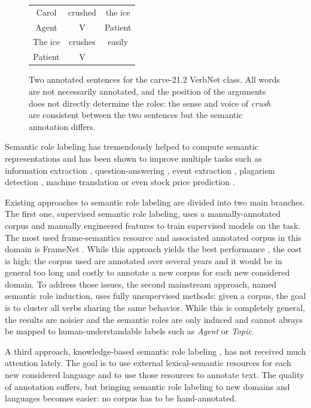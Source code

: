 \begin{figure}[ht]
    \centering
    \begin{tabular}{ccc}
        \toprule
        Carol & crushed   & the ice \\
        Agent & V         & Patient \\
        \midrule
        The ice & crushes & easily  \\
        Patient & V       &         \\
        \bottomrule
    \end{tabular}
    \caption{\label{fig:example_srl}Two annotated sentences for the carve-21.2 VerbNet class. All words are not necessarily annotated, and the position of the arguments does not directly determine the roles: the sense and voice of \textit{crush} are consistent between the two sentences but the semantic annotation differs.}
\end{figure}

Semantic role labeling has tremendously helped to compute semantic
representations and has been shown to improve multiple tasks such as
information extraction \citep{surdeanu2003using}, question-answering
\citep{shen2007using}, event extraction \citep{exner2011using},
plagarism detection \citep{osman2012improved}, machine translation
\citep{bazrafshan2013semantic} or even stock price prediction
\citep{xie2013semantic}.

Existing approaches to semantic role labeling are divided into two main
branches. The first one, supervised semantic role labeling, uses a
manually-annotated corpus and manually engineered features to train supervised
models on the task. The most used frame-semantics resource and associated
annotated corpus in this domain is FrameNet \citep{baker1998berkeley}.
While this approach yields the best performance \citep{das2013frame}, the
cost is high: the corpus used are annotated over several years and it would be
in general too long and costly to annotate a new corpus for each new considered
domain. To address those issues, the second mainstream approach, named semantic
role induction, uses fully unsupervised methods: given a corpus, the goal is to
cluster all verbs sharing the same behavior. While this is completely general,
the results are noisier and the semantic roles are only induced and cannot
always be mapped to human-understandable labels such as \textit{Agent} or
\textit{Topic}.

A third approach, knowledge-based semantic role labeling
\citep{swier2004unsupervised,swier2005exploiting}, has not received much
attention lately. The goal is to use external lexical-semantic resources for
each new considered language and to use those resources to annotate text. The
quality of annotation suffers, but bringing semantic role labeling to new
domains and languages becomes easier: no corpus has to be hand-annotated.

